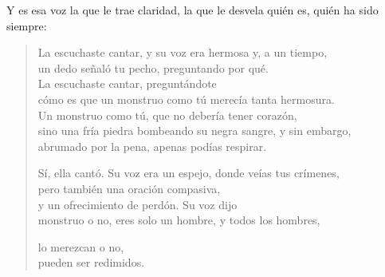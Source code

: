 \documentclass[11pt,a4paper]{article}
\begin{document}
Y es esa voz la que le trae claridad, la que le desvela quién es, quién ha sido siempre:

\begin{verse}
La escuchaste cantar, y su voz era hermosa y, a un tiempo,\\
un dedo señaló tu pecho, preguntando por qué.\\
La escuchaste cantar, preguntándote\\
cómo es que un monstruo como tú merecía tanta hermosura.\\
Un monstruo como tú, que no debería tener corazón,\\
sino una fría piedra bombeando su negra sangre, y sin embargo,\\
abrumado por la pena, apenas podías respirar.

Sí, ella cantó. Su voz era un espejo, donde veías tus crímenes,\\
pero también una oración compasiva,\\
y un ofrecimiento de perdón. Su voz dijo\\
monstruo o no, eres solo un hombre, y todos los hombres,

lo merezcan o no,\\
pueden ser redimidos.
\end{verse}
\end{document}
